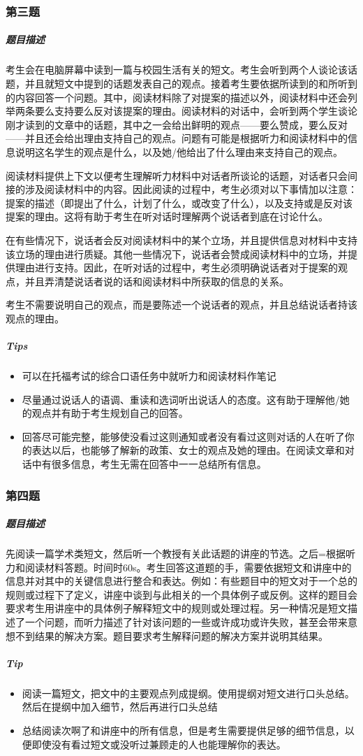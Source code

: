 \documentclass[UTF8]{ctexart}
\begin{document}
\subsubsection{第三题}
\subparagraph{题目描述}考生会在电脑屏幕中读到一篇与校园生活有关的短文。考生会听到两个人谈论该话题，并且就短文中提到的话题发表自己的观点。接着考生要依据所读到的和所听到的内容回答一个问题。其中，阅读材料除了对提案的描述以外，阅读材料中还会列举两条要么支持要么反对该提案的理由。阅读材料的对话中，会听到两个学生谈论刚才读到的文章中的话题，其中之一会给出鲜明的观点——要么赞成，要么反对——并且还会给出理由支持自己的观点。问题有可能是根据听力和阅读材料中的信息说明这名学生的观点是什么，以及她/他给出了什么理由来支持自己的观点。\par
阅读材料提供上下文以便考生理解听力材料中对话者所谈论的话题，对话者只会间接的涉及阅读材料中的内容。因此阅读的过程中，考生必须对以下事情加以注意：提案的描述（即提出了什么，计划了什么，或改变了什么），以及支持或是反对该提案的理由。这将有助于考生在听对话时理解两个说话者到底在讨论什么。\par
在有些情况下，说话者会反对阅读材料中的某个立场，并且提供信息对材料中支持该立场的理由进行质疑。其他一些情况下，说话者会赞成阅读材料中的立场，并提供理由进行支持。因此，在听对话的过程中，考生必须明确说话者对于提案的观点，并且弄清楚说话者说的话和阅读材料中所获取的信息的关系。\par
考生不需要说明自己的观点，而是要陈述一个说话者的观点，并且总结说话者持该观点的理由。
\subparagraph{Tips}
\begin{itemize}
  \item 可以在托福考试的综合口语任务中就听力和阅读材料作笔记
  \item 尽量通过说话人的语调、重读和选词听出说话人的态度。这有助于理解他/她的观点并有助于考生规划自己的回答。
  \item 回答尽可能完整，能够使没看过这则通知或者没有看过这则对话的人在听了你的表达以后，也能够了解新的政策、女士的观点及她的理由。在阅读文章和对话中有很多信息，考生无需在回答中一一总结所有信息。
\end{itemize}
\subsubsection{第四题}
\subparagraph{题目描述}先阅读一篇学术类短文，然后听一个教授有关此话题的讲座的节选。之后=根据听力和阅读材料答题。时间时60s。考生回答这道题的手，需要依据短文和讲座中的信息并对其中的关键信息进行整合和表达。例如：有些题目中的短文对于一个总的规则或过程下了定义，讲座中谈到与此相关的一个具体例子或反例。这样的题目会要求考生用讲座中的具体例子解释短文中的规则或处理过程。另一种情况是短文描述了一个问题，而听力描述了针对该问题的一些或许成功或许失败，甚至会带来意想不到结果的解决方案。题目要求考生解释问题的解决方案并说明其结果。
\subparagraph{Tip}
\begin{itemize}
  \item 阅读一篇短文，把文中的主要观点列成提纲。使用提纲对短文进行口头总结。然后在提纲中加入细节，然后再进行口头总结
  \item 总结阅读次啊了和讲座中的所有信息，但是考生需要提供足够的细节信息，以便即使没有看过短文或没听过兼顾走的人也能理解你的表达。
\end{itemize}
\end{document}
